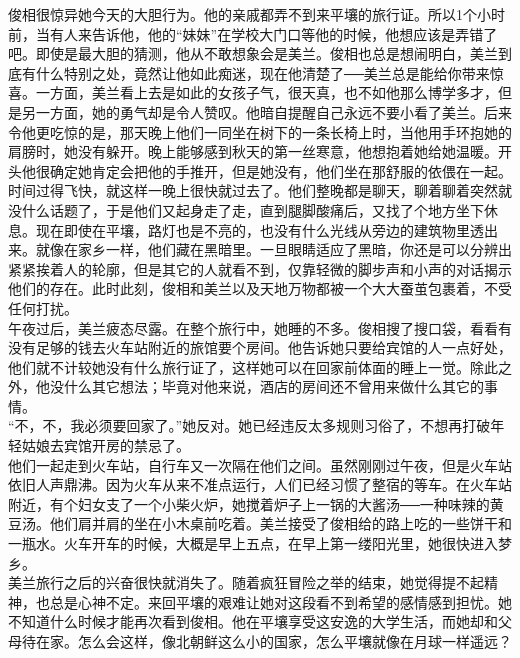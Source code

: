 俊相很惊异她今天的大胆行为。他的亲戚都弄不到来平壤的旅行证。所以1个小时前，当有人来告诉他，他的“妹妹”在学校大门口等他的时候，他想应该是弄错了吧。即使是最大胆的猜测，他从不敢想象会是美兰。俊相也总是想闹明白，美兰到底有什么特别之处，竟然让他如此痴迷，现在他清楚了──美兰总是能给你带来惊喜。一方面，美兰看上去是如此的女孩子气，很天真，也不如他那么博学多才，但是另一方面，她的勇气却是令人赞叹。他暗自提醒自己永远不要小看了美兰。后来令他更吃惊的是，那天晚上他们一同坐在树下的一条长椅上时，当他用手环抱她的肩膀时，她没有躲开。晚上能够感到秋天的第一丝寒意，他想抱着她给她温暖。开头他很确定她肯定会把他的手推开，但是她没有，他们坐在那舒服的依偎在一起。\\

时间过得飞快，就这样一晚上很快就过去了。他们整晚都是聊天，聊着聊着突然就没什么话题了，于是他们又起身走了走，直到腿脚酸痛后，又找了个地方坐下休息。现在即使在平壤，路灯也是不亮的，也没有什么光线从旁边的建筑物里透出来。就像在家乡一样，他们藏在黑暗里。一旦眼睛适应了黑暗，你还是可以分辨出紧紧挨着人的轮廓，但是其它的人就看不到，仅靠轻微的脚步声和小声的对话揭示他们的存在。此时此刻，俊相和美兰以及天地万物都被一个大大蚕茧包裹着，不受任何打扰。\\

午夜过后，美兰疲态尽露。在整个旅行中，她睡的不多。俊相搜了搜口袋，看看有没有足够的钱去火车站附近的旅馆要个房间。他告诉她只要给宾馆的人一点好处，他们就不计较她没有什么旅行证了，这样她可以在回家前体面的睡上一觉。除此之外，他没什么其它想法；毕竟对他来说，酒店的房间还不曾用来做什么其它的事情。\\

“不，不，我必须要回家了。”她反对。她已经违反太多规则习俗了，不想再打破年轻姑娘去宾馆开房的禁忌了。\\

他们一起走到火车站，自行车又一次隔在他们之间。虽然刚刚过午夜，但是火车站依旧人声鼎沸。因为火车从来不准点运行，人们已经习惯了整宿的等车。在火车站附近，有个妇女支了一个小柴火炉，她搅着炉子上一锅的大酱汤──一种味辣的黄豆汤。他们肩并肩的坐在小木桌前吃着。美兰接受了俊相给的路上吃的一些饼干和一瓶水。火车开车的时候，大概是早上五点，在早上第一缕阳光里，她很快进入梦乡。\\

美兰旅行之后的兴奋很快就消失了。随着疯狂冒险之举的结束，她觉得提不起精神，也总是心神不定。来回平壤的艰难让她对这段看不到希望的感情感到担忧。她不知道什么时候才能再次看到俊相。他在平壤享受这安逸的大学生活，而她却和父母待在家。怎么会这样，像北朝鲜这么小的国家，怎么平壤就像在月球一样遥远？\\


